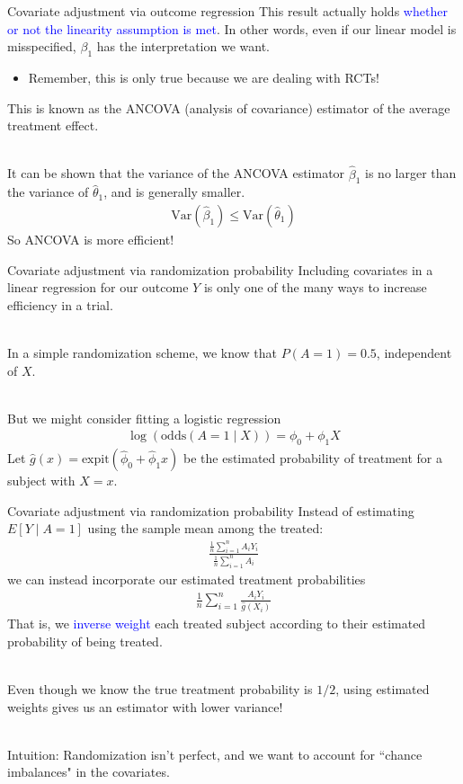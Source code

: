 \documentclass[10pt,t]{beamer}
\begin{document}
\begin{frame}{Covariate adjustment via outcome regression}
	This result actually holds \textcolor{blue}{whether or not the linearity assumption is met}. In other words, even if our linear model is misspecified, $\beta_1$ has the interpretation we want. 
	\begin{itemize}
		\item Remember, this is only true because we are dealing with RCTs!
	\end{itemize}
	This is known as the ANCOVA (analysis of covariance) estimator of the average treatment effect. 
	\\ ~\ 
	
	It can be shown that the variance of the ANCOVA estimator $\hat{\beta}_1$ is no larger than the variance of $\hat{\theta}_1$, and is generally smaller.
	\begin{align*}
		\text{Var}(\hat{\beta}_1) \leq \text{Var}(\hat{\theta}_1)
	\end{align*} 
	So ANCOVA is more efficient!
\end{frame}

\begin{frame}{Covariate adjustment via randomization probability}
	Including covariates in a linear regression for our outcome $Y$ is only one of the many ways to increase efficiency in a trial. 
	\\ ~\ 
	
	In a simple randomization scheme, we know that $P(A = 1) = 0.5$, independent of $X$. 
	\\ ~\ 
	
	But we might consider fitting a logistic regression
	\begin{align*}
		\log(\text{odds}(A = 1 \mid X)) = \phi_0 + \phi_1 X
	\end{align*}
	Let $\hat{g}(x) = \text{expit}(\hat{\phi}_0 + \hat{\phi}_1x)$ be the estimated probability of treatment for a subject with $X = x$. 
\end{frame}

\begin{frame}{Covariate adjustment via randomization probability}
	\vspace{-0.5cm}
	Instead of estimating $E[Y \mid A = 1]$ using the sample mean among the treated:
	\begin{align*}
		\frac{\frac{1}{n}\sum_{i=1}^{n}A_i Y_i}{\frac{1}{n}\sum_{i=1}^{n}A_i}
	\end{align*}
	we can instead incorporate our estimated treatment probabilities
	\begin{align*}
		\frac{1}{n}\sum_{i=1}^{n}\frac{A_i Y_i}{\hat{g}(X_i)}
	\end{align*}
	That is, we \textcolor{blue}{inverse weight} each treated subject according to their estimated probability of being treated. 
	\\ ~\ 
	
	Even though we know the true treatment probability is $1/2$, using estimated weights gives us an estimator with lower variance!
	\\ ~\ 
	
	Intuition: Randomization isn't perfect, and we want to account for ``chance imbalances" in the covariates. 
\end{frame}
\end{document}

